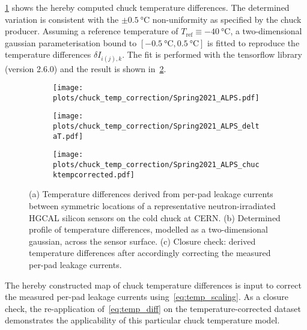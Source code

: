 \ref{plot:chucktemp_before} shows the hereby computed chuck temperature differences.
The determined variation is consistent with the $\pm\SI{0.5}{\celsius}$ non-uniformity as specified by the chuck producer.
Assuming a reference temperature of $T_\text{ref}\equiv\SI{-40}{\celsius}$, a two-dimensional gaussian parameterisation bound to $[\SI{-0.5}{\celsius}, \SI{0.5}{\celsius}]$ is fitted to reproduce the temperature differences $\delta I_{i(j),k}$.
The fit is performed with the tensorflow library (version 2.6.0) and the result is shown in~\ref{plot:chucktemp_correction}.
\begin{figure}
	\captionsetup[subfigure]{aboveskip=-1pt,belowskip=-1pt}
	\centering
	\begin{subfigure}[b]{0.32\textwidth}
		\texttt{[image: plots/chuck\_temp\_correction/Spring2021\_ALPS.pdf]}
		\subcaption{
		}
		\label{plot:chucktemp_before}
	\end{subfigure}
	\hfill
	\begin{subfigure}[b]{0.32\textwidth}
		\texttt{[image: plots/chuck\_temp\_correction/Spring2021\_ALPS\_deltaT.pdf]}
		\subcaption{
		}
		\label{plot:chucktemp_correction}
	\end{subfigure}
	\hfill
	\begin{subfigure}[b]{0.32\textwidth}
		\texttt{[image: plots/chuck\_temp\_correction/Spring2021\_ALPS\_chucktempcorrected.pdf]}
		\subcaption{
		}
		\label{plot:chucktemp_after}
	\end{subfigure}
	\caption{
		(a) Temperature differences derived from per-pad leakage currents between symmetric locations of a representative neutron-irradiated HGCAL silicon sensors on the cold chuck at CERN.
		(b) Determined profile of temperature differences, modelled as a two-dimensional gaussian, across the sensor surface.
		(c) Closure check: derived temperature differences after accordingly correcting the measured per-pad leakage currents.
	}
\end{figure}
The hereby constructed map of chuck temperature differences is input to correct the measured per-pad leakage currents using~\ref{eq:temp_scaling}.
As a closure check, the re-application of~\ref{eq:temp_diff} on the temperature-corrected dataset demonstrates the applicability of this particular chuck temperature model.
